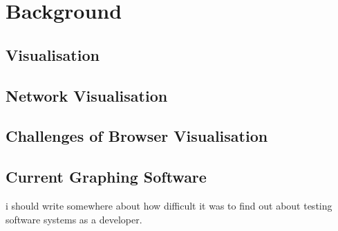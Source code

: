 \documentclass[../dissertation.tex]{subfiles}
\begin{document}
\chapter{Background}

\section{Visualisation}

\section{Network Visualisation}

\section{Challenges of Browser Visualisation}

\section{Current Graphing Software}

i should write somewhere about how difficult it was to find out about testing software systems as a developer.
\end{document}
